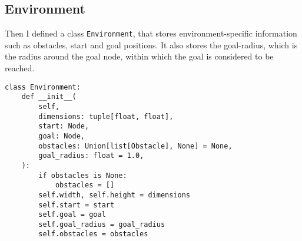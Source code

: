\documentclass[12pt]{report}
\begin{document}
\subsection{Environment}

Then I defined a class \texttt{Environment}, that stores environment-specific information such as obstacles, start and goal positions. It also stores the goal-radius, which is the radius around the goal node, within which the goal is considered to be reached.

\begin{lstlisting}[caption={Environment Class}]
class Environment:
    def __init__(
        self,
        dimensions: tuple[float, float],
        start: Node,
        goal: Node,
        obstacles: Union[list[Obstacle], None] = None,
        goal_radius: float = 1.0,
    ):
        if obstacles is None:
            obstacles = []
        self.width, self.height = dimensions
        self.start = start
        self.goal = goal
        self.goal_radius = goal_radius
        self.obstacles = obstacles
\end{lstlisting}
\end{document}
